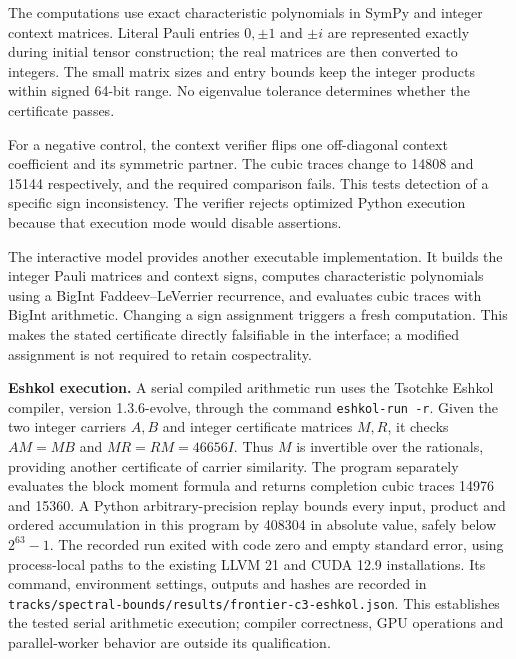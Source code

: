 \documentclass[11pt,letterpaper]{article}
\begin{document}
The computations use exact characteristic polynomials in SymPy and integer context matrices. Literal Pauli entries \(0,\pm1\) and \(\pm i\) are represented exactly during initial tensor construction; the real matrices are then converted to integers. The small matrix sizes and entry bounds keep the integer products within signed 64-bit range. No eigenvalue tolerance determines whether the certificate passes.

For a negative control, the context verifier flips one off-diagonal context coefficient and its symmetric partner. The cubic traces change to 14808 and 15144 respectively, and the required comparison fails. This tests detection of a specific sign inconsistency. The verifier rejects optimized Python execution because that execution mode would disable assertions.

The interactive model provides another executable implementation. It builds the integer Pauli matrices and context signs, computes characteristic polynomials using a BigInt Faddeev--LeVerrier recurrence, and evaluates cubic traces with BigInt arithmetic. Changing a sign assignment triggers a fresh computation. This makes the stated certificate directly falsifiable in the interface; a modified assignment is not required to retain cospectrality.

\textbf{Eshkol execution.} A serial compiled arithmetic run uses the Tsotchke Eshkol compiler, version 1.3.6-evolve, through the command \texttt{eshkol-run -r}. Given the two integer carriers \(A,B\) and integer certificate matrices \(M,R\), it checks \(AM=MB\) and \(MR=RM=46656I\). Thus \(M\) is invertible over the rationals, providing another certificate of carrier similarity. The program separately evaluates the block moment formula and returns completion cubic traces 14976 and 15360. A Python arbitrary-precision replay bounds every input, product and ordered accumulation in this program by 408304 in absolute value, safely below \(2^{63}-1\). The recorded run exited with code zero and empty standard error, using process-local paths to the existing LLVM 21 and CUDA 12.9 installations. Its command, environment settings, outputs and hashes are recorded in \nolinkurl{tracks/spectral-bounds/results/frontier-c3-eshkol.json}. This establishes the tested serial arithmetic execution; compiler correctness, GPU operations and parallel-worker behavior are outside its qualification.
\end{document}
